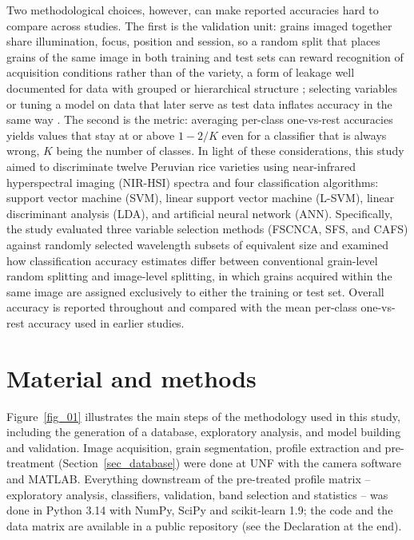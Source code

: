 \documentclass[final,5p,times,twocolumn]{elsarticle}
\newcommand{\added}[1]{{\color{blue}#1}}
\begin{document}
Two methodological choices, however, can make reported accuracies hard to compare across studies. The first is the validation unit: grains imaged together share illumination, focus, position and session, so a random split that places grains of the same image in both training and test sets can reward recognition of acquisition conditions rather than of the variety, a form of leakage well documented for data with grouped or hierarchical structure \citep{Roberts2017,Kaufman2012}; selecting variables or tuning a model on data that later serve as test data inflates accuracy in the same way \citep{Varma2006,Westerhuis2008}. The second is the metric: averaging per-class one-vs-rest accuracies yields values that stay at or above $1-2/K$ even for a classifier that is always wrong, $K$ being the number of classes.
In light of these considerations, this study aimed to discriminate twelve Peruvian rice varieties using near-infrared hyperspectral imaging (NIR-HSI) spectra and four classification algorithms: support vector machine (SVM), linear support vector machine (L-SVM), linear discriminant analysis (LDA), and artificial neural network (ANN). Specifically, the study evaluated three variable selection methods (FSCNCA, SFS, and CAFS) against randomly selected wavelength subsets of equivalent size and examined how classification accuracy estimates differ between conventional grain-level random splitting and image-level splitting, in which grains acquired within the same image are assigned exclusively to either the training or test set. Overall accuracy is reported throughout and compared with the mean per-class one-vs-rest accuracy used in earlier studies.




\section{Material and methods}

Figure~\ref{fig_01} illustrates the main steps of the methodology used in this study, including the generation of a database, exploratory analysis, and model building and validation.
\added{Image acquisition, grain segmentation, profile extraction and pre-treatment (Section~\ref{sec_database}) were done at UNF with the camera software and MATLAB. Everything downstream of the pre-treated profile matrix -- exploratory analysis, classifiers, validation, band selection and statistics -- was done in Python 3.14 with NumPy, SciPy and scikit-learn 1.9; the code and the data matrix are available in a public repository (see the Declaration at the end).}
\end{document}

